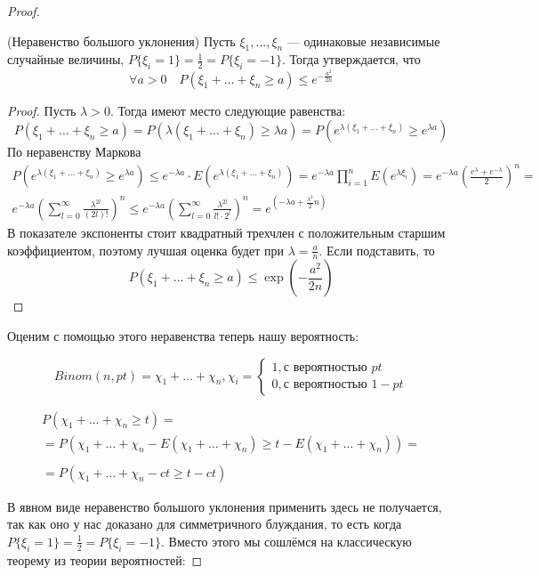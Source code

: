 \begin{proof}
\begin{theorem} (Неравенство большого уклонения)
	Пусть $\xi_1, \ldots, \xi_n$ --- одинаковые независимые случайные величины, $P\{\xi_i = 1\} = \frac{1}{2} = P\{\xi_i = -1\}$. Тогда утверждается, что
	\[
		\forall a > 0 \quad P(\xi_1 + \ldots + \xi_n \ge a) \le e^{-\frac{a^2}{2n}}
	\]
\end{theorem}

\begin{proof}
	Пусть $\lambda > 0$. Тогда имеют место следующие равенства:
	\[
		P(\xi_1 + \ldots + \xi_n \ge a) = P(\lambda(\xi_1 + \ldots + \xi_n) \ge \lambda a) = P(e^{\lambda (\xi_1 + \ldots + \xi_n)} \ge e^{\lambda a})
	\]
	По неравенству Маркова
	\begin{multline*}
		P(e^{\lambda (\xi_1 + \ldots + \xi_n)} \ge e^{\lambda a}) \le e^{-\lambda a} \cdot E(e^{\lambda(\xi_1 + \ldots + \xi_n)}) = e^{-\lambda a} \prod_{i = 1}^n E(e^{\lambda \xi_i}) = e^{-\lambda a} (\frac{e^\lambda + e^{-\lambda}}{2})^n =
		\\
		e^{-\lambda a} (\sum_{l = 0}^\infty \frac{\lambda^{2l}}{(2l)!})^n \le e^{-\lambda a} (\sum_{l = 0}^\infty \frac{\lambda^{2l}}{l! \cdot 2^l})^n = e^{{(-\lambda a + \frac{\lambda^2}{2}n)}}
	\end{multline*}
	В показателе экспоненты стоит квадратный трехчлен с положительным старшим коэффициентом, поэтому лучшая оценка будет при $\lambda = \frac{a}{n}$. Если подставить, то
	\[
		P(\xi_1 + \ldots + \xi_n \ge a) \le \exp({-\frac{a^2}{2n}})
	\]
\end{proof}

Оценим с помощью этого неравенства теперь нашу вероятность:

\[
Binom(n, pt) = \chi_1 + \dots + \chi_n, \chi_i = \begin{cases}
    1, \text{с вероятностью }pt\\0,\text{с вероятностью } 1-pt
\end{cases}
\]

\begin{multline*}
P(\chi_1 + \dots + \chi_n \geq t) =\\
=P(\chi_1 + \dots + \chi_n - E(\chi_1 + \dots + \chi_n) \geq t - E(\chi_1 + \dots + \chi_n)) =\\
\\=P(\chi_1 + \dots + \chi_n-ct\geq t-ct)
\end{multline*}

В явном виде неравенство большого уклонения применить здесь не получается, так как оно у нас доказано для симметричного блуждания, то есть когда  $P\{\xi_i = 1\} = \frac{1}{2} = P\{\xi_i = -1\}$.
Вместо этого мы сошлёмся на классическую теорему из теории вероятностей:


\end{proof}
